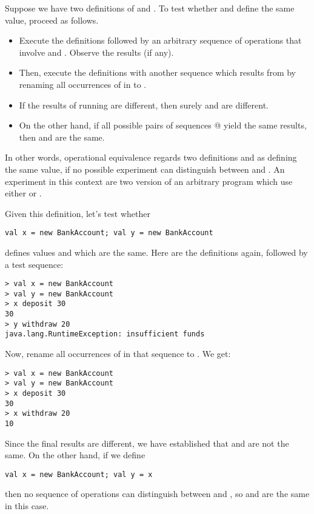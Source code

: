 {Suppose we have two definitions of  and .
To test whether  and  define the same value, proceed
as follows.
\begin{itemize}
\item
Execute the definitions followed by an
arbitrary sequence  of operations that involve  and
. Observe the results (if any).
\item
Then, execute the definitions with another sequence  which
results from  by renaming all occurrences of  in
 to .
\item
If the results of running  are different, then surely
 and  are different.
\item
On the other hand, if all possible pairs of sequences @
yield the same results, then  and  are the same.
\end{itemize}
In other words, operational equivalence regards two definitions
 and  as defining the same value, if no possible
experiment can distinguish between  and . An
experiment in this context are two version of an arbitrary program which use either
 or .
 
Given this definition, let's test whether
\begin{lstlisting}
val x = new BankAccount; val y = new BankAccount
\end{lstlisting}
defines values  and  which are the same.
Here are the definitions again, followed by a test sequence:

\begin{lstlisting}
> val x = new BankAccount
> val y = new BankAccount
> x deposit 30
30
> y withdraw 20
java.lang.RuntimeException: insufficient funds
\end{lstlisting}

Now, rename all occurrences of  in that sequence to
. We get:
\begin{lstlisting}
> val x = new BankAccount
> val y = new BankAccount
> x deposit 30
30
> x withdraw 20
10
\end{lstlisting}
Since the final results are different, we have established that
 and  are not the same.
On the other hand, if we define
\begin{lstlisting}
val x = new BankAccount; val y = x
\end{lstlisting}
then no sequence of operations can distinguish between  and
, so  and  are the same in this case.

}
